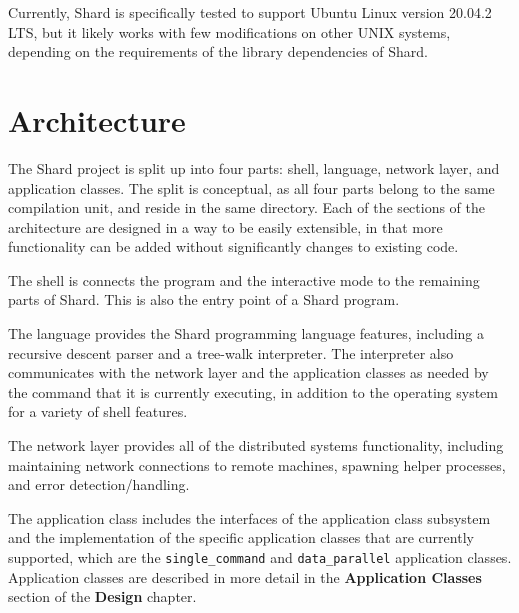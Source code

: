\documentclass[twoside]{report}
\begin{document}
Currently, Shard is specifically tested to support Ubuntu Linux version 20.04.2 LTS, but it likely works with few modifications on other UNIX systems, depending on the requirements of the library dependencies of Shard.

\section{Architecture}


The Shard project is split up into four parts: shell, language, network layer, and application classes. The split is conceptual, as all four parts belong to the same compilation unit, and reside in the same directory.
Each of the sections of the architecture are designed in a way to be easily extensible, in that more functionality can be added without significantly changes to existing code.

The shell is connects the program and the interactive mode to the remaining parts of Shard. This is also the entry point of a Shard program.

The language provides the Shard programming language features, including a recursive descent parser and a tree-walk interpreter. The interpreter also communicates with the network layer and the application classes as needed by the command that it is currently executing, in addition to the operating system for a variety of shell features.

The network layer provides all of the distributed systems functionality, including maintaining network connections to remote machines, spawning helper processes, and error detection/handling.

\begin{sloppypar}
  The application class includes the interfaces of the application class subsystem and the implementation of the specific application classes that are currently supported, which are the \texttt{single\_command} and \texttt{data\_parallel} application classes. Application classes are described in more detail in the \textbf{Application Classes} section of the \textbf{Design} chapter.
\end{sloppypar}
\end{document}
